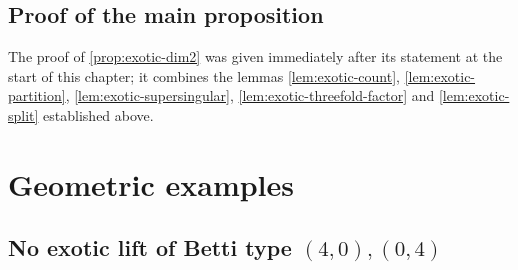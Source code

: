 \subsection*{Proof of the main proposition}

The proof of \cref{prop:exotic-dim2} was given immediately after its statement at
the start of this chapter; it combines the lemmas
\cref{lem:exotic-count}, \cref{lem:exotic-partition},
\cref{lem:exotic-supersingular}, \cref{lem:exotic-threefold-factor} and
\cref{lem:exotic-split} established above.

\section{Geometric examples}

\subsection*{No exotic lift of Betti type \texorpdfstring{$(4,0),(0,4)$}{(4,0),(0,4)}}

